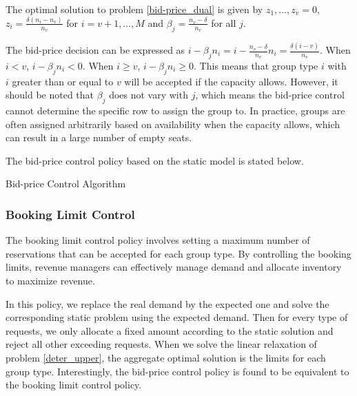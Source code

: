 \begin{lem}\label{bid-price}
 The optimal solution to problem \eqref{bid-price_dual} is given by $z_1 ,\ldots, z_v =0$, $z_{i} = \frac{\delta(n_i-n_v)}{n_v}$ for $i = v+1, \ldots, M$ and $\beta_j = \frac{n_v - \delta}{n_v}$ for all $j$.
\end{lem}

The bid-price decision can be expressed as $i - \beta_j n_i = i - \frac{n_v - \delta}{n_v} n_i = \frac{\delta (i - v)}{n_v}$. When $i < v$, $i - \beta_j n_i < 0$. When $i \geq v$, $i - \beta_j n_i \geq 0$. This means that group type $i$ with $i$ greater than or equal to $v$ will be accepted if the capacity allows. However, it should be noted that $\beta_j$ does not vary with $j$, which means the bid-price control cannot determine the specific row to assign the group to. In practice, groups are often assigned arbitrarily based on availability when the capacity allows, which can result in a large number of empty seats.

The bid-price control policy based on the static model is stated below.

\begin{algorithm}[H]
  \caption{Bid-price Control Algorithm}\label{algo_bid}
\end{algorithm}


\subsubsection*{Booking Limit Control}

The booking limit control policy involves setting a maximum number of reservations that can be accepted for each group type. By controlling the booking limits, revenue managers can effectively manage demand and allocate inventory to maximize revenue.

In this policy, we replace the real demand by the expected one and solve the corresponding static problem using the expected demand. Then for every type of requests, we only allocate a fixed amount according to the static solution and reject all other exceeding requests. When we solve the linear relaxation of problem \eqref{deter_upper}, the aggregate optimal solution is the limits for each group type. Interestingly, the bid-price control policy is found to be equivalent to the booking limit control policy.

